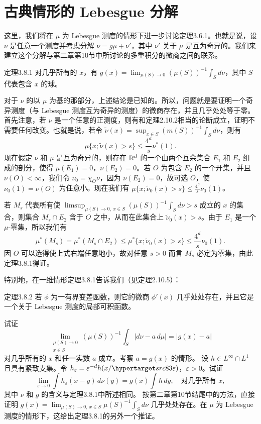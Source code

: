 \section{古典情形的 Lebesgue 分解}
这里，我们将在 $\mu$ 为 Lebesgue 测度的情形下进一步讨论定理3.6.1。也就是说，设 $\nu$ 是任意一个测度并考虑分解 $\nu=g\mu+\nu'$，其中 $\nu'$ 关于 $\mu$ 是互为奇异的。我们来建立这个分解与第二章第10节中所讨论的多重积分的微商之间的联系。
\begin{statement}{定理}{3.8.1}
对几乎所有的 $x$，有 $g(x)=\lim_{\mu(S)\to0}(\mu(S))^{-1}\int_S d\nu$，其中 $S$ 代表包含 $x$ 的球。
\end{statement}
对于 $\nu$ 的以 $\mu$ 为基的那部分，上述结论是已知的。所以，问题就是要证明一个奇异测度（与 Lebesgue 测度互为奇异的测度）的微商存在，并且几乎处处等于零。
首先注意，若 $\nu$ 是一个任意的正测度，则有和定理2.10.2相当的论断成立，证明不需要任何改变。也就是说，若令 $\widetilde\nu(x)=\sup_{x\in S}(m(S))^{-1}\int_S d\nu$，则有
\[\mu\{x;\widetilde\nu(x)>s\}\le\frac{4^d}{s}\nu^*(1).\]
现在假定 $\nu$ 和 $\mu$ 是互为奇异的，则存在 $\mathbb R^d$ 的一个由两个互余集合 $E_1$ 和 $E_2$ 组成的剖分，使得 $\mu(E_1)=0$，$\nu(E_2)=0$。若 $O$ 为包含 $E_2$ 的一个开集，并且 $\nu(O)<\infty$，我们令 $\nu_0=\chi_O\nu$，因为 $\nu(E_2)=0$，故可选 $O$，使 $\nu_0(1)=\nu(O)$ 为任意小。现在我们有 $\mu\{x;\widetilde\nu_0(x)>s\}\le\frac{4^d}{s}\nu_0(1)$。

若 $M_s$ 代表所有使 $\limsup_{\mu(S)\to0,\ x\in S}(\mu(S))^{-1}\int_S d\nu>s$ 成立的 $x$ 的集合，则集合 $M_s\cap E_2$ 含于 $O$ 之中，从而在此集合上 $\widetilde\nu_0(x)>s$。由于 $E_1$ 是一个 $\mu$-零集，所以我们有
\[\mu^*(M_s)=\mu^*(M_s\cap E_2)\le\mu^*\{x;\widetilde\nu_0(x)>s\}\le\frac{4^d}{s}\nu_0(1).\]
因 $O$ 可以选得使上式右端任意地小，故对任意 $s>0$ 而言 $M_s$ 必定为零集，由此定理3.8.1得证。

特别地，在一维情形定理3.8.1告诉我们（见定理2.10.5）：
\begin{statement}{定理}{3.8.2}
若 $\phi$ 为一有界变差函数，则它的微商 $\phi'(x)$ 几乎处处存在，并且它是一个关于 Lebesgue 测度的局部可积函数。
\end{statement}
\Exercise 试证
\[\lim_{\substack{\mu(S)\to0\\x\in S}}(\mu(S))^{-1}\int_S|d\nu-a\,d\mu|=|g(x)-a|\]
对几乎所有的 $x$ 和任一实数 $a$ 成立。考察 $a=g(x)$ 的情形。
\Exercise 设 $h\in L^\infty\cap L^1$ 且具有紧致支集。令 $h_\varepsilon=\varepsilon^{-d}h(x/
\SourcePage{83}
\varepsilon)$，$\varepsilon>0$。试证
\[\lim_{\varepsilon\to0}\int h_\varepsilon(x-y)\,d\nu(y)=g(x)\int h\,dy,\quad\text{对几乎所有 }x,\]
其中 $\nu$ 和 $g$ 的含义与定理3.8.1中所述相同。
\Exercise 按第二章第10节结尾中的方法，直接证明 $g(x)=\lim_{\mu(S)\to0,\ x\in S}\mu(S)^{-1}\int_S d\nu$ 几乎处处存在。在 $\mu$ 为 Lebesgue 测度的情形下，这给出定理3.8.1的另外一个推证。
